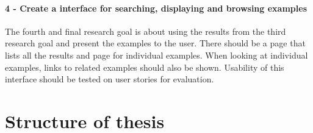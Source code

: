 
\paragraph{4 - Create a interface for searching, displaying and browsing examples}
The fourth and final research goal is about using the results from the third research goal and present the examples to the user. There should be a page that lists all the results and page for individual examples. When looking at individual examples, links to related examples should also be shown. Usability of this interface should be tested on user stories for evaluation.

\section{Structure of thesis}
\cleardoublepage